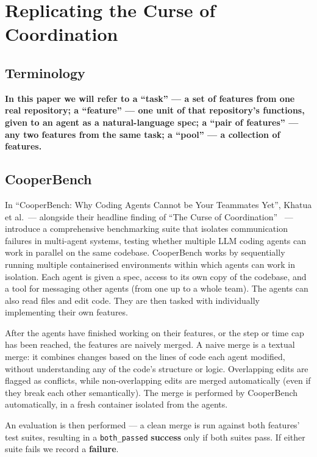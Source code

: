 \documentclass[11pt,a4paper]{article}
\begin{document}
\section{Replicating the Curse of Coordination}\label{sec:replication}

\subsection{Terminology}\label{sec:terminology}

\textbf{In this paper we will refer to a ``task'' --- a set of features from one real repository; a ``feature'' --- one unit of that repository's functions, given to an agent as a natural-language spec; a ``pair of features'' --- any two features from the same task; a ``pool'' --- a collection of features.}

\subsection{CooperBench}\label{sec:cooperbench}

In ``CooperBench: Why Coding Agents Cannot be Your Teammates Yet'', Khatua et al.\ --- alongside their headline finding of ``The Curse of Coordination''~\cite{khatua2026cooperbench} --- introduce a comprehensive benchmarking suite that isolates communication failures in multi-agent systems, testing whether multiple LLM coding agents can work in parallel on the same codebase. CooperBench works by sequentially running multiple containerised environments within which agents can work in isolation. Each agent is given a spec, access to its own copy of the codebase, and a tool for messaging other agents (from one up to a whole team). The agents can also read files and edit code. They are then tasked with individually implementing their own features.

After the agents have finished working on their features, or the step or time cap has been reached, the features are naively merged. A naive merge is a textual merge: it combines changes based on the lines of code each agent modified, without understanding any of the code's structure or logic. Overlapping edits are flagged as conflicts, while non-overlapping edits are merged automatically (even if they break each other semantically). The merge is performed by CooperBench automatically, in a fresh container isolated from the agents.

An evaluation is then performed --- a clean merge is run against both features' test suites, resulting in a \texttt{both\_passed} \textbf{success} only if both suites pass. If either suite fails we record a \textbf{failure}.
\end{document}
